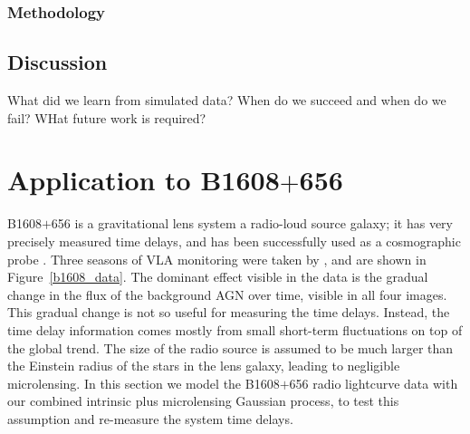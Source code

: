 \documentclass[useAMS,usenatbib, a4paper]{mn2e} \usepackage{natbib}
\begin{document}
\subsubsection{Methodology}
\subsection{Discussion}

What did we learn from simulated data?
When do we succeed and when do we fail?
WHat future work is required?


\section{Application to B1608$+$656}

B1608$+$656 is a gravitational lens system a radio-loud source galaxy; it has 
very precisely measured time delays, and has been successfully used as a
cosmographic probe \citep[e.g.][]{Suy++10}.  Three seasons of VLA monitoring
were taken by  \citet{2002ApJ...581..823F, 1999ApJ...527..498F},  and are
shown in Figure~\ref{b1608_data}. The dominant effect visible in the data is
the gradual change in the flux of the background AGN over time, visible in all
four images. This gradual change is not so useful for measuring the time
delays. Instead, the time delay information comes mostly from small short-term
fluctuations on top of the global trend. The size of the radio source is
assumed to be much larger than the Einstein radius of the stars in the lens
galaxy, leading to negligible microlensing. In this section we model the
B1608$+$656 radio lightcurve data with our combined intrinsic plus
microlensing Gaussian process, to test this assumption and re-measure the
system time delays.


\end{document}
